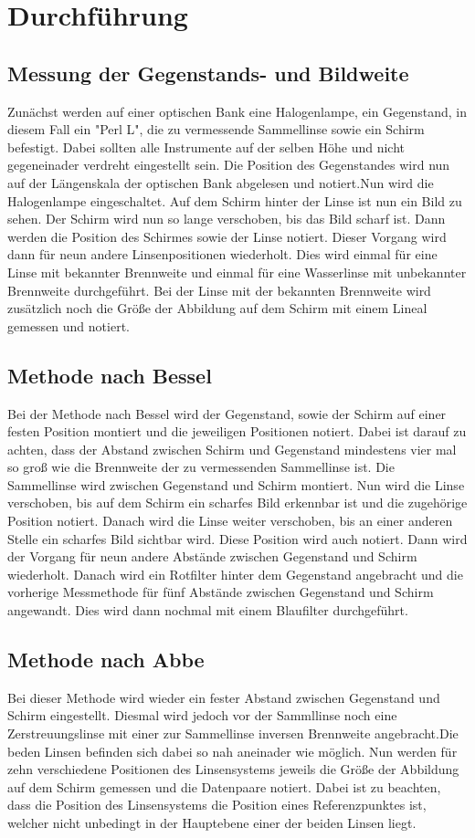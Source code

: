 \section{Durchführung}
\label{sec:Durchführung}
\subsection{Messung der Gegenstands- und Bildweite}
Zunächst werden auf einer optischen Bank eine Halogenlampe, ein Gegenstand, in diesem Fall ein "Perl L", die zu vermessende Sammellinse sowie ein Schirm befestigt.
Dabei sollten alle Instrumente auf der selben Höhe und nicht gegeneinader verdreht eingestellt sein. Die Position des Gegenstandes wird nun
auf der Längenskala der optischen Bank abgelesen und notiert.Nun wird die Halogenlampe eingeschaltet. Auf dem Schirm hinter der Linse ist nun ein Bild zu sehen.
Der Schirm wird nun so lange verschoben, bis das Bild scharf ist. Dann werden die Position des Schirmes sowie der Linse notiert. Dieser Vorgang wird dann für neun
andere Linsenpositionen wiederholt. Dies wird einmal für eine Linse mit bekannter Brennweite und einmal für eine Wasserlinse mit unbekannter Brennweite durchgeführt.
Bei der Linse mit der bekannten Brennweite wird zusätzlich noch die Größe der Abbildung auf dem Schirm mit einem Lineal gemessen und notiert.

\subsection{Methode nach Bessel}
\label{sec:bessel}
Bei der Methode nach Bessel wird der Gegenstand, sowie der Schirm auf einer festen Position montiert und die jeweiligen Positionen notiert. Dabei ist darauf zu achten,
dass der Abstand zwischen Schirm und Gegenstand mindestens vier mal so groß wie die Brennweite der zu vermessenden Sammellinse ist. Die Sammellinse wird zwischen
Gegenstand und Schirm montiert. Nun wird die Linse verschoben, bis auf dem Schirm ein scharfes Bild erkennbar ist und die zugehörige Position notiert. Danach wird die
Linse weiter verschoben, bis an einer anderen Stelle ein scharfes Bild sichtbar wird. Diese Position wird auch notiert. Dann wird der Vorgang für neun andere
Abstände zwischen Gegenstand und Schirm wiederholt. Danach wird ein Rotfilter hinter dem Gegenstand angebracht und die vorherige Messmethode für fünf Abstände zwischen
Gegenstand und Schirm angewandt. Dies wird dann nochmal mit einem Blaufilter durchgeführt.

\subsection{Methode nach Abbe}
Bei dieser Methode wird wieder ein fester Abstand zwischen Gegenstand und Schirm eingestellt. Diesmal wird jedoch vor der Sammllinse noch eine Zerstreuungslinse mit
einer zur Sammellinse inversen Brennweite angebracht.Die beden Linsen befinden sich dabei so nah aneinader wie möglich. Nun werden für zehn verschiedene Positionen des
Linsensystems jeweils die Größe der Abbildung auf dem Schirm gemessen und die Datenpaare notiert. Dabei ist zu beachten, dass die Position des Linsensystems die Position
eines Referenzpunktes ist, welcher nicht unbedingt in der Hauptebene einer der beiden Linsen liegt.
